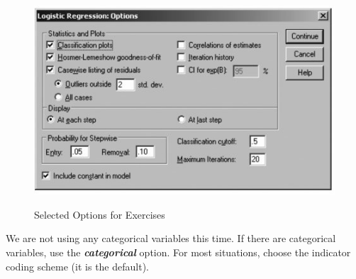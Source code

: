 \documentclass[a4paper,12pt]{article}
\begin{document}
\begin{figure}[h!]
\begin{center}
  \includegraphics[scale=0.8]{images/Logistic10}\\
  \caption{Selected Options for Exercises}
\end{center}
\end{figure}

We are not using any categorical variables this time. If there are categorical variables, use the \textbf{\textit{categorical}} option. For most situations, choose the indicator coding scheme (it is the
default).
\end{document}
